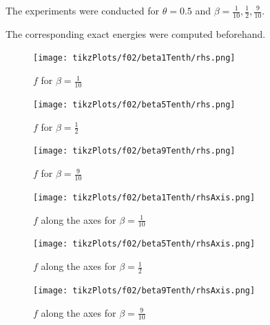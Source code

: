 \documentclass[draft=false,twoside,12pt]{scrreprt}
\begin{document}
The experiments were conducted for $\theta = 0.5$ and 
$\beta = \frac{1}{10}, \frac{1}{2},
\frac{9}{10}$.

The corresponding exact energies were computed beforehand.

\vspace{-\parskip}
\begin{minipage}[t]{0.3\textwidth}
  \begin{figure}[H]
	  \centering
		\texttt{[image: tikzPlots/f02/beta1Tenth/rhs.png]} 
    \caption{$f$ for $\beta=\frac{1}{10}$}
  \end{figure}
\end{minipage}
\hfill
\vline
\hfill
\begin{minipage}[t]{0.3\textwidth}
  \begin{figure}[H]
	  \centering
		\texttt{[image: tikzPlots/f02/beta5Tenth/rhs.png]} 
    \caption{$f$ for $\beta=\frac{1}{2}$}
  \end{figure}
\end{minipage}
\hfill
\vline
\hfill
\begin{minipage}[t]{0.3\textwidth}
  \begin{figure}[H]
	  \centering
		\texttt{[image: tikzPlots/f02/beta9Tenth/rhs.png]} 
    \caption{$f$ for $\beta=\frac{9}{10}$}
  \end{figure}
\end{minipage}

\vspace{-\parskip}
\begin{minipage}[t]{0.3\textwidth}
  \begin{figure}[H]
	  \centering
		\texttt{[image: tikzPlots/f02/beta1Tenth/rhsAxis.png]} 
    \caption{$f$ along the axes for $\beta=\frac{1}{10}$}
  \end{figure}
\end{minipage}
\hfill
\vline
\hfill
\begin{minipage}[t]{0.3\textwidth}
  \begin{figure}[H]
	  \centering
		\texttt{[image: tikzPlots/f02/beta5Tenth/rhsAxis.png]} 
    \caption{$f$ along the axes for $\beta=\frac{1}{2}$}
  \end{figure}
\end{minipage}
\hfill
\vline
\hfill
\begin{minipage}[t]{0.3\textwidth}
  \begin{figure}[H]
	  \centering
		\texttt{[image: tikzPlots/f02/beta9Tenth/rhsAxis.png]} 
    \caption{$f$ along the axes for $\beta=\frac{9}{10}$}
  \end{figure}
\end{minipage}
\end{document}
